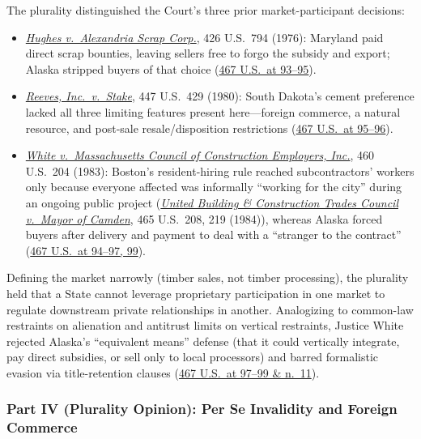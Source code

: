 \documentclass[12pt]{article}
\begin{document}
The plurality distinguished the Court's three prior market-participant decisions:
\begin{itemize}
    \item \href{https://supreme.justia.com/cases/federal/us/426/794/}{\textit{Hughes v.\ Alexandria Scrap Corp.}}, 426 U.S.\ 794 (1976): Maryland paid direct scrap bounties, leaving sellers free to forgo the subsidy and export; Alaska stripped buyers of that choice (\href{https://supreme.justia.com/cases/federal/us/467/82/}{467 U.S.\ at 93--95}).
    \item \href{https://supreme.justia.com/cases/federal/us/447/429/}{\textit{Reeves, Inc.\ v.\ Stake}}, 447 U.S.\ 429 (1980): South Dakota's cement preference lacked all three limiting features present here---foreign commerce, a natural resource, and post-sale resale/disposition restrictions (\href{https://supreme.justia.com/cases/federal/us/467/82/}{467 U.S.\ at 95--96}).
    \item \href{https://supreme.justia.com/cases/federal/us/460/204/}{\textit{White v.\ Massachusetts Council of Construction Employers, Inc.}}, 460 U.S.\ 204 (1983): Boston's resident-hiring rule reached subcontractors' workers only because everyone affected was informally ``working for the city'' during an ongoing public project (\href{https://supreme.justia.com/cases/federal/us/465/208/}{\textit{United Building \& Construction Trades Council v.\ Mayor of Camden}}, 465 U.S.\ 208, 219 (1984)), whereas Alaska forced buyers after delivery and payment to deal with a ``stranger to the contract'' (\href{https://supreme.justia.com/cases/federal/us/467/82/}{467 U.S.\ at 94--97, 99}).
\end{itemize}
Defining the market narrowly (timber sales, not timber processing), the plurality held that a State cannot leverage proprietary participation in one market to regulate downstream private relationships in another. Analogizing to common-law restraints on alienation and antitrust limits on vertical restraints, Justice White rejected Alaska's ``equivalent means'' defense (that it could vertically integrate, pay direct subsidies, or sell only to local processors) and barred formalistic evasion via title-retention clauses (\href{https://supreme.justia.com/cases/federal/us/467/82/}{467 U.S.\ at 97--99 \& n.\ 11}).

\subsubsection{Part IV (Plurality Opinion): Per Se Invalidity and Foreign Commerce}
\end{document}
